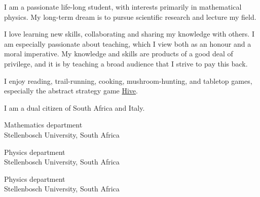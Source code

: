 
I am a passionate life-long student, with interests primarily in mathematical physics. My long-term dream is to pursue scientific research and lecture my field.

\medskip

I love learning new skills, collaborating and sharing my knowledge with others. I am especially passionate about teaching, which I view both as an honour and a moral imperative. My knowledge and skills are products of a good deal of privilege, and it is by teaching a broad audience that I strive to pay this back.

\medskip

I enjoy reading, trail-running, cooking, mushroom-hunting, and tabletop games, especially the abstract strategy game
\href{https://github.com/Doormango/hive}{Hive}.

\medskip

I am a dual citizen of South Africa and Italy.



\smallskip



{Mathematics department\\Stellenbosch University, South Africa}

\divider

{Physics department\\Stellenbosch University, South Africa}

\divider

{Physics department\\Stellenbosch University, South Africa}